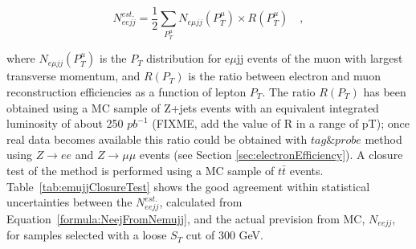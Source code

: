 \begin{equation} \label{formula:NeejFromNemujj}
N_{eejj}^{est.} = \frac{1}{2}\sum_{P_{T}^{\mu}} N_{e\mu jj}(P_{T}^{\mu}) \times R(P_{T}^{\mu}) \quad , 
\end{equation}

where $N_{e\mu jj}(P_{T}^{\mu})$ is the $P_{T}$ distribution for e$\mu$jj events of the muon  
with largest transverse momentum, and $R(P_{T})$ is the ratio between electron 
and muon reconstruction efficiencies as a function of lepton $P_{T}$. The ratio $R(P_{T})$ has been obtained 
using a MC sample of Z+jets events with an equivalent integrated luminosity of about 250 $pb^{-1}$ 
(FIXME, add the value of R in a range of pT); 
once real data becomes available this ratio could be obtained with $tag\&probe$ method using $Z \rightarrow ee$ and 
$Z \rightarrow \mu\mu$ events (see Section \ref{sec:electronEfficiency}).
A closure test of the method is performed using a MC sample of $t\bar{t}$ events. 
Table~\ref{tab:emujjClosureTest} shows the good agreement within statistical uncertainties between 
the $N_{eejj}^{est.}$, calculated from Equation~\ref{formula:NeejFromNemujj}, 
and the actual prevision from MC, $N_{eejj}$, for samples selected with a loose $S_{T}$ cut of 300 GeV.   



